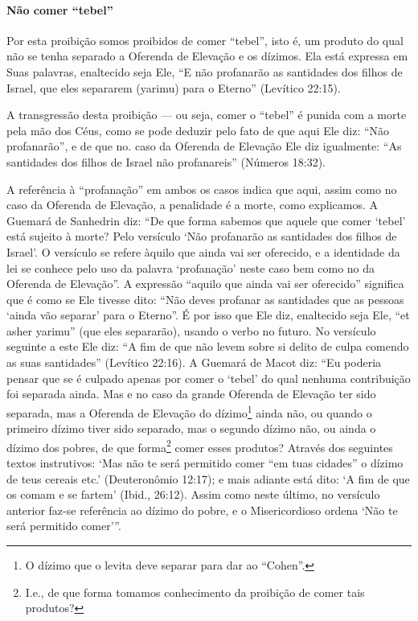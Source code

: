 \paragraph{Não comer ``tebel''}

Por esta proibição somos proibidos de comer ``tebel'', isto é, um
produto do qual não se tenha separado a Oferenda de Elevação e os
dízimos. Ela está expressa em Suas palavras, enaltecido seja Ele, ``E
não profanarão as santidades dos filhos de Israel, que eles separarem
(yarimu) para o Eterno'' (Levítico 22:15).

A transgressão desta proibição --- ou seja, comer o ``tebel'' é punida
com a morte pela mão dos Céus, como se pode deduzir pelo fato de que
aqui Ele diz: ``Não profanarão'', e de que no. caso da Oferenda de
Elevação Ele diz igualmente: ``As santidades dos filhos de Israel não
profanareis'' (Números 18:32).

A referência à ``profanação'' em ambos os casos indica que aqui, assim
como no caso da Oferenda de Elevação, a penalidade é a morte, como
explicamos.
A Guemará de Sanhedrin diz: ``De que forma sabemos que aquele
que comer `tebel' está sujeito à morte? Pelo versículo `Não profanarão
as santidades dos filhos de Israel'. O versículo se refere àquilo que
ainda vai ser oferecido, e a identidade da lei se conhece pelo uso da
palavra `profanação' neste caso bem como no da Oferenda de Elevação''. A
expressão ``aquilo que ainda vai ser oferecido'' significa que é como se
Ele tivesse dito: ``Não deves profanar as santidades que as pessoas
`ainda vão separar' para o Eterno''. É por isso que Ele diz, enaltecido
seja Ele, ``et asher yarimu'' (que eles separarão), usando o verbo no
futuro. No versículo seguinte a este Ele diz: ``A fim de que não levem
sobre si delito de culpa comendo as suas santidades'' (Levítico 22:16).
A Guemará de Macot diz: ``Eu poderia pensar que se é culpado apenas por
comer o `tebel' do qual nenhuma contribuição foi separada ainda. Mas
e no caso da grande Oferenda de Elevação ter sido separada, mas a
Oferenda de Elevação do dízimo\footnote{O dízimo que o levita deve separar para dar ao ``Cohen''.} ainda não, ou quando o
primeiro dízimo tiver sido separado, mas o segundo dízimo não, ou ainda
o dízimo dos pobres, de que forma\footnote{I.e., de que forma tomamos conhecimento da proibição de comer tais
  produtos?} comer esses
produtos? Através dos seguintes textos instrutivos: `Mas não te será
permitido comer ``em tuas cidades'' o dízimo de teus cereais etc.'
(Deuteronômio 12:17); e mais adiante está dito: `A fim de que os comam e
se fartem' (Ibid., 26:12). Assim como neste último, no versículo
anterior faz-se referência ao dízimo do pobre, e o Misericordioso ordena
`Não te será permitido comer'''.

